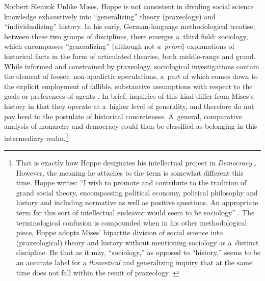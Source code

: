 \begin{artengenv}{Norbert Slenzok}
Unlike Mises, Hoppe is not consistent in dividing social science knowledge exhaustively into ``generalizing'' theory (praxeology) and ``individualizing'' history. In his early, German-language methodological treatise, between these two groups of disciplines, there emerges a~third field: sociology, which encompasses ``generalizing'' (although not \textit{a~priori}) explanations of historical facts in the form of articulated theories, both middle-range and grand. While informed and constrained by praxeology, sociological investigations contain the element of looser, non-apodictic speculations, a~part of which comes down to the explicit employment of fallible, substantive assumptions with respect to the goals or preferences of agents 
\parencite[][pp.33–38]{hoppe_kritik_1983}. %
 In brief, inquiries of this kind differ from Mises's history in that they operate at a~higher level of generality, and therefore do not pay heed to the postulate of historical concreteness. A~general, comparative analysis of monarchy and democracy could then be classified as belonging in this intermediary realm.\footnote{That is exactly how Hoppe designates his intellectual project in \textit{Democracy}… However, the meaning he attaches to the term is somewhat different this time. Hoppe writes: ``I wish to promote and contribute to the tradition of grand social theory, encompassing political economy, political philosophy and history and including normative as well as positive questions. An appropriate term for this sort of intellectual endeavor would seem to be sociology'' 
\parencite[][p.xxiv]{hoppe_democracy_2007}. %
 The terminological confusion is compounded when in his other methodological piece, Hoppe 
\parencite[][p.43]{hoppe_economic_2007} %
 adopts Mises' bipartite division of social science into (praxeological) theory and history without mentioning sociology as a~distinct discipline. Be that as it may, ``sociology,'' as opposed to ``history,'' seems to be an accurate label for a \textit{theoretical} and generalizing inquiry that at the same time does not fall within the remit of praxeology 
\parencite[on the standing of sociology in thesee][]{robitaille_ludwig_2019}.%
}




\end{artengenv}
